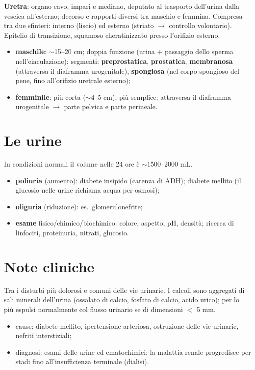 \textbf{Uretra}: organo cavo, impari e mediano, deputato al trasporto dell'urina dalla vescica
all'esterno; decorso e rapporti diversi tra maschio e femmina. Compresa tra due sfinteri: interno
(liscio) ed esterno (striato $\rightarrow$ controllo volontario). Epitelio di transizione, squamoso
cheratinizzato presso l'orifizio esterno.
\begin{itemize}
  \item \textbf{maschile}: $\sim$15--20 cm; doppia funzione (urina + passaggio dello sperma
    nell'eiaculazione); segmenti: \textbf{preprostatica}, \textbf{prostatica}, \textbf{membranosa}
    (attraversa il diaframma urogenitale), \textbf{spongiosa} (nel corpo spongioso del pene, fino
    all'orifizio uretrale esterno);
  \item \textbf{femminile}: più corta ($\sim$4--5 cm), più semplice; attraversa il diaframma
    urogenitale $\rightarrow$ parte pelvica e parte perineale.
\end{itemize}

\section{Le urine}

In condizioni normali il volume nelle 24 ore è $\sim$1500--2000 mL.
\begin{itemize}
  \item \textbf{poliuria} (aumento): diabete insipido (carenza di ADH); diabete mellito (il glucosio
    nelle urine richiama acqua per osmosi);
  \item \textbf{oliguria} (riduzione): es.\ glomerulonefrite;
  \item \textbf{esame} fisico/chimico/biochimico: colore, aspetto, pH, densità; ricerca di linfociti,
    proteinuria, nitrati, glucosio.
\end{itemize}

\section{Note cliniche}

Tra i disturbi più dolorosi e comuni delle vie urinarie. I calcoli sono aggregati di sali minerali
dell'urina (ossalato di calcio, fosfato di calcio, acido urico); per lo più espulsi normalmente col
flusso urinario se di dimensioni $<$ 5 mm.

\begin{itemize}
  \item cause: diabete mellito, ipertensione arteriosa, ostruzione delle vie urinarie, nefriti
    interstiziali;
  \item diagnosi: esami delle urine ed ematochimici; la malattia renale progredisce per stadi fino
    all'insufficienza terminale (dialisi).
\end{itemize}

